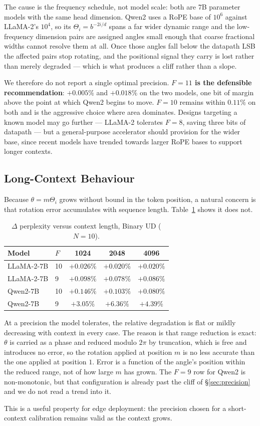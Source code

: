 The cause is the frequency schedule, not model scale: both are 7B parameter
models with the same head dimension. Qwen2 uses a RoPE base of $10^{6}$
against LLaMA-2's $10^{4}$, so its $\Theta_i = b^{-2i/d}$ spans a far wider
dynamic range and the low-frequency dimension pairs are assigned angles small
enough that coarse fractional widths cannot resolve them at all. Once those
angles fall below the datapath LSB the affected pairs stop rotating, and the
positional signal they carry is lost rather than merely degraded --- which is
what produces a cliff rather than a slope.

We therefore do not report a single optimal precision. \textbf{$F=11$ is the
defensible recommendation}: $+0.005\%$ and $+0.018\%$ on the two models, one
bit of margin above the point at which Qwen2 begins to move. $F=10$ remains
within $0.11\%$ on both and is the aggressive choice where area dominates.
Designs targeting a known model may go further --- LLaMA-2 tolerates $F=8$,
saving three bits of datapath --- but a general-purpose accelerator should
provision for the wider base, since recent models have trended towards larger
RoPE bases to support longer contexts.

\subsection{Long-Context Behaviour}
\label{sec:longctx}

Because $\theta = m\Theta_i$ grows without bound in the token position, a
natural concern is that rotation error accumulates with sequence length.
Table~\ref{tab:longctx} shows it does not.

\begin{table}[t]
\caption{$\Delta$ perplexity versus context length, Binary UD ($N=10$).}
\label{tab:longctx}
\centering
\begin{tabular}{llccc}
\toprule
Model & $F$ & 1024 & 2048 & 4096 \\
\midrule
LLaMA-2-7B & 10 & $+0.026\%$ & $+0.020\%$ & $+0.020\%$ \\
LLaMA-2-7B & 9  & $+0.098\%$ & $+0.078\%$ & $+0.086\%$ \\
Qwen2-7B   & 10 & $+0.146\%$ & $+0.103\%$ & $+0.080\%$ \\
Qwen2-7B   & 9  & $+3.05\%$  & $+6.36\%$  & $+4.39\%$ \\
\bottomrule
\end{tabular}
\end{table}

At a precision the model tolerates, the relative degradation is flat or mildly
decreasing with context in every case. The reason is that range reduction is
exact: $\theta$ is carried as a phase and reduced modulo $2\pi$ by truncation,
which is free and introduces no error, so the rotation applied at position
$m$ is no less accurate than the one applied at position $1$. Error is a
function of the angle's position within the reduced range, not of how large
$m$ has grown. The $F=9$ row for Qwen2 is non-monotonic, but that
configuration is already past the cliff of \S\ref{sec:precision} and we do not
read a trend into it.

This is a useful property for edge deployment: the precision chosen for a
short-context calibration remains valid as the context grows.
